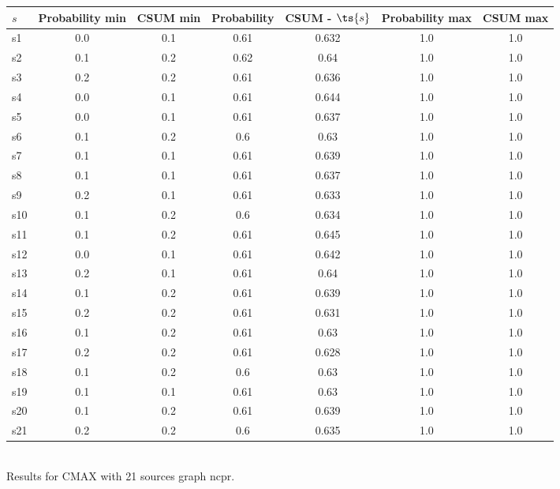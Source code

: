 \documentclass{article}
\begin{document}
\noindent\begin{tabular}{|l|c|c|c|c|c|c|}
\hline
$s$& Probability min & CSUM min & Probability & CSUM - $\ts{s}$ & Probability max & CSUM max\\
\hline
s1 &0.0 & 0.1 & 0.61 & 0.632 & 1.0 & 1.0\\
\hline
s2 &0.1 & 0.2 & 0.62 & 0.64 & 1.0 & 1.0\\
\hline
s3 &0.2 & 0.2 & 0.61 & 0.636 & 1.0 & 1.0\\
\hline
s4 &0.0 & 0.1 & 0.61 & 0.644 & 1.0 & 1.0\\
\hline
s5 &0.0 & 0.1 & 0.61 & 0.637 & 1.0 & 1.0\\
\hline
s6 &0.1 & 0.2 & 0.6 & 0.63 & 1.0 & 1.0\\
\hline
s7 &0.1 & 0.1 & 0.61 & 0.639 & 1.0 & 1.0\\
\hline
s8 &0.1 & 0.1 & 0.61 & 0.637 & 1.0 & 1.0\\
\hline
s9 &0.2 & 0.1 & 0.61 & 0.633 & 1.0 & 1.0\\
\hline
s10 &0.1 & 0.2 & 0.6 & 0.634 & 1.0 & 1.0\\
\hline
s11 &0.1 & 0.2 & 0.61 & 0.645 & 1.0 & 1.0\\
\hline
s12 &0.0 & 0.1 & 0.61 & 0.642 & 1.0 & 1.0\\
\hline
s13 &0.2 & 0.1 & 0.61 & 0.64 & 1.0 & 1.0\\
\hline
s14 &0.1 & 0.2 & 0.61 & 0.639 & 1.0 & 1.0\\
\hline
s15 &0.2 & 0.2 & 0.61 & 0.631 & 1.0 & 1.0\\
\hline
s16 &0.1 & 0.2 & 0.61 & 0.63 & 1.0 & 1.0\\
\hline
s17 &0.2 & 0.2 & 0.61 & 0.628 & 1.0 & 1.0\\
\hline
s18 &0.1 & 0.2 & 0.6 & 0.63 & 1.0 & 1.0\\
\hline
s19 &0.1 & 0.1 & 0.61 & 0.63 & 1.0 & 1.0\\
\hline
s20 &0.1 & 0.2 & 0.61 & 0.639 & 1.0 & 1.0\\
\hline
s21 &0.2 & 0.2 & 0.6 & 0.635 & 1.0 & 1.0\\
\hline
\end{tabular}\\

\noindent Results for CMAX with 21 sources graph ncpr.
\end{document}

